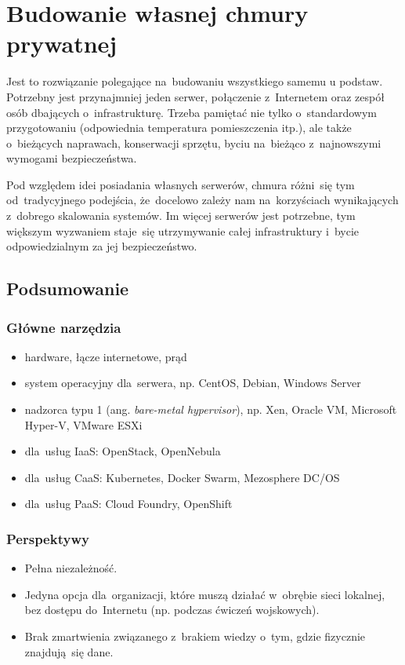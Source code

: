 \documentclass[12pt,a4paper,twoside,titlepage,openright]{book}
\begin{document}
\section{Budowanie własnej chmury prywatnej} \label{section:chmuraPrywatna}

Jest to rozwiązanie polegające na~budowaniu wszystkiego samemu u podstaw. Potrzebny jest przynajmniej jeden serwer, połączenie z~Internetem oraz zespół osób dbających o~infrastrukturę. Trzeba pamiętać nie tylko o~standardowym przygotowaniu (odpowiednia temperatura pomieszczenia itp.), ale także o~bieżących naprawach, konserwacji sprzętu, byciu na~bieżąco z~najnowszymi wymogami bezpieczeństwa. 

Pod względem idei posiadania własnych serwerów, chmura różni~się tym od~tradycyjnego podejścia, że~docelowo zależy nam na~korzyściach wynikających z~dobrego skalowania systemów. Im więcej serwerów jest potrzebne, tym większym wyzwaniem staje~się utrzymywanie całej infrastruktury i~bycie odpowiedzialnym za jej bezpieczeństwo. 

\subsection*{Podsumowanie}

\subsubsection*{Główne narzędzia}
\begin{itemize}
\item hardware, łącze internetowe, prąd
\item system operacyjny dla~serwera, np. CentOS, Debian, Windows Server
\item nadzorca typu 1 (ang. \textit{bare-metal hypervisor}), np. Xen, Oracle VM, Microsoft Hyper-V, VMware ESXi
\item dla~usług IaaS: OpenStack, OpenNebula
\item dla~usług CaaS: Kubernetes, Docker Swarm, Mezosphere DC/OS
\item dla~usług PaaS: Cloud Foundry, OpenShift
\end{itemize}

\subsubsection{Perspektywy}
\begin{itemize}
\item Pełna niezależność.
\item Jedyna opcja dla~organizacji, które muszą działać w~obrębie sieci lokalnej, bez dostępu do~Internetu (np. podczas ćwiczeń wojskowych).
\item Brak zmartwienia związanego z~brakiem wiedzy o~tym, gdzie fizycznie znajdują~się dane.
\end{itemize}
\end{document}
